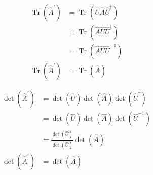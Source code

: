 \documentclass[12pt, letterpaper]{article}
\begin{document}
\begin{align*}
    \operatorname{Tr}\left(\hat{A}^{\prime}\right)&=\operatorname{Tr}\left(\hat{U}\hat{A}\hat{U}^\dagger\right)\\
    &=\operatorname{Tr}\left(\hat{A}\hat{U}\hat{U}^\dagger\right)\\
    &=\operatorname{Tr}\left(\hat{A}\hat{U}\hat{U}^{-1}\right)\\
    \operatorname{Tr}\left(\hat{A}^{\prime}\right)&=\operatorname{Tr}\left(\hat{A}\right)
\end{align*}

\begin{align*}
    \operatorname{det}(\hat{A}^\prime) &= \operatorname{det}(\hat{U})\operatorname{det}(\hat{A})\operatorname{det}(\hat{U}^\dagger)\\
    &= \operatorname{det}(\hat{U})\operatorname{det}(\hat{A})\operatorname{det}(\hat{U}^{-1})\\
    &= \frac{\operatorname{det}(\hat{U})}{\operatorname{det}(\hat{U})}\operatorname{det}(\hat{A})\\
    \operatorname{det}\left(\hat{A}^{\prime}\right)&=\operatorname{det}\left(\hat{A}\right)
\end{align*}
\end{document}
